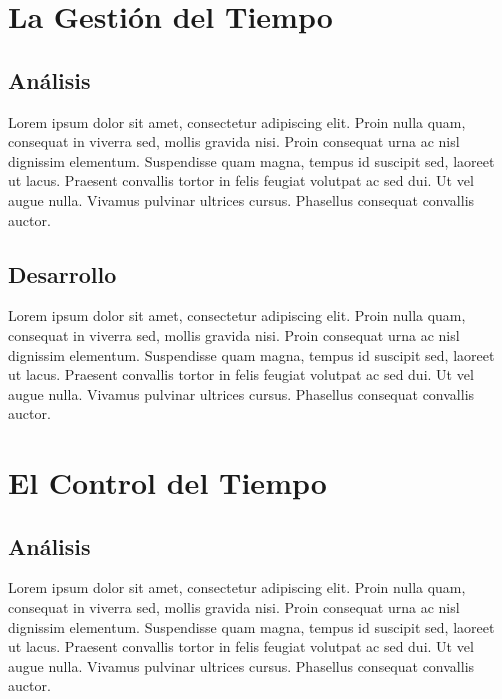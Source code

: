 \documentclass[a4paper,12pt,openany,oneside]{book}
\begin{document}
\chapter{La Gestión del Tiempo}
\thispagestyle{empty}
\section{Análisis}
Lorem ipsum dolor sit amet, consectetur adipiscing elit. Proin nulla quam, consequat in viverra sed, mollis gravida nisi. Proin consequat urna ac nisl dignissim elementum. Suspendisse quam magna, tempus id suscipit sed, laoreet ut lacus. Praesent convallis tortor in felis feugiat volutpat ac sed dui. Ut vel augue nulla. Vivamus pulvinar ultrices cursus. Phasellus consequat convallis auctor.
\section{Desarrollo}
Lorem ipsum dolor sit amet, consectetur adipiscing elit. Proin nulla quam, consequat in viverra sed, mollis gravida nisi. Proin consequat urna ac nisl dignissim elementum. Suspendisse quam magna, tempus id suscipit sed, laoreet ut lacus. Praesent convallis tortor in felis feugiat volutpat ac sed dui. Ut vel augue nulla. Vivamus pulvinar ultrices cursus. Phasellus consequat convallis auctor.
\chapter{El Control del Tiempo}
\thispagestyle{empty}
\section{Análisis}
Lorem ipsum dolor sit amet, consectetur adipiscing elit. Proin nulla quam, consequat in viverra sed, mollis gravida nisi. Proin consequat urna ac nisl dignissim elementum. Suspendisse quam magna, tempus id suscipit sed, laoreet ut lacus. Praesent convallis tortor in felis feugiat volutpat ac sed dui. Ut vel augue nulla. Vivamus pulvinar ultrices cursus. Phasellus consequat convallis auctor.
\end{document}
